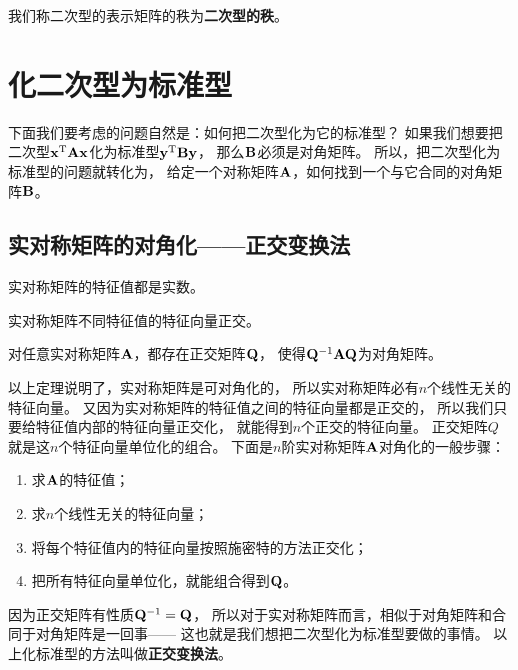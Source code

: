 \begin{definition}[二次型的秩]
  我们称二次型的表示矩阵的秩为\textbf{二次型的秩}。
\end{definition}

\section{化二次型为标准型}
下面我们要考虑的问题自然是：如何把二次型化为它的标准型？
如果我们想要把二次型$\mathbf{x}^{\textrm{T}}\mathbf{A}\mathbf{x}$化为标准型$\mathbf{y}^{\textrm{T}}\mathbf{B}\mathbf{y}$，
那么$\mathbf{B}$必须是对角矩阵。
所以，把二次型化为标准型的问题就转化为，
给定一个对称矩阵$\mathbf{A}$，如何找到一个与它合同的对角矩阵$\mathbf{B}$。

\subsection{实对称矩阵的对角化——正交变换法}
\begin{theorem}
  实对称矩阵的特征值都是实数。
\end{theorem}

\begin{theorem}
  实对称矩阵不同特征值的特征向量正交。
\end{theorem}

\begin{theorem}[实对称矩阵的可对角化]
  对任意实对称矩阵$\mathbf{A}$，都存在正交矩阵$\mathbf{Q}$，
  使得$\mathbf{Q}^{-1}\mathbf{A}\mathbf{Q}$为对角矩阵。
\end{theorem}

以上定理说明了，实对称矩阵是可对角化的，
所以实对称矩阵必有$n$个线性无关的特征向量。
又因为实对称矩阵的特征值之间的特征向量都是正交的，
所以我们只要给特征值内部的特征向量正交化，
就能得到$n$个正交的特征向量。
正交矩阵$Q$就是这$n$个特征向量单位化的组合。
下面是$n$阶实对称矩阵$\mathbf{A}$对角化的一般步骤：
\begin{enumerate}
  \item
  求$\mathbf{A}$的特征值；
  \item
  求$n$个线性无关的特征向量；
  \item
  将每个特征值内的特征向量按照施密特的方法正交化；
  \item
  把所有特征向量单位化，就能组合得到$\mathbf{Q}$。
\end{enumerate}

\begin{remark}
  因为正交矩阵有性质$\mathbf{Q}^{-1}=\mathbf{Q}$，
  所以对于实对称矩阵而言，相似于对角矩阵和合同于对角矩阵是一回事——
  这也就是我们想把二次型化为标准型要做的事情。
  以上化标准型的方法叫做\textbf{正交变换法}。
\end{remark}

